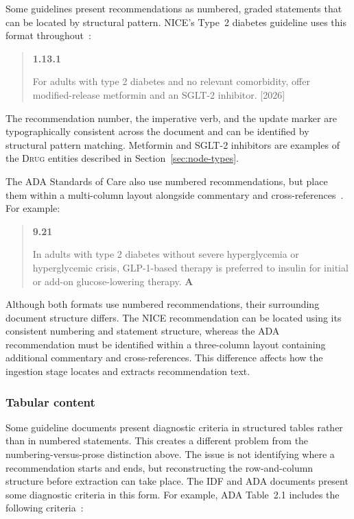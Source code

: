 Some guidelines present recommendations as numbered, graded statements
that can be located by structural pattern. NICE's Type~2 diabetes
guideline uses this format throughout~\cite{NICE_T2_2026}:

\begin{quote}
\noindent
\textbf{1.13.1}\quad
\begin{minipage}[t]{0.82\linewidth}
For adults with type 2 diabetes and no relevant comorbidity, offer
modified-release metformin and an SGLT-2 inhibitor.
\hfill\textnormal{[2026]}
\end{minipage}
\end{quote}

The recommendation number, the imperative verb, and the update marker are
typographically consistent across the document and can be identified by
structural pattern matching. Metformin and SGLT-2 inhibitors are examples
of the \textsc{Drug} entities described in
Section~\ref{sec:node-types}.

The ADA Standards of Care also use numbered
recommendations, but place them within a multi-column layout alongside
commentary and cross-references~\cite{ADA2026}. For example:

\begin{quote}
\noindent
\textbf{9.21}\quad
\begin{minipage}[t]{0.82\linewidth}
In adults with type 2 diabetes without severe hyperglycemia or
hyperglycemic crisis, GLP-1-based therapy is preferred to insulin for
initial or add-on glucose-lowering therapy.
\hfill\textbf{A}
\end{minipage}
\end{quote}

Although both formats use numbered recommendations, their surrounding
document structure differs. The NICE recommendation can be located using
its consistent numbering and statement structure, whereas the ADA
recommendation must be identified within a three-column layout containing
additional commentary and cross-references. This difference affects how
the ingestion stage locates and extracts recommendation text.

\subsubsection{Tabular content}

Some guideline documents present diagnostic criteria in structured tables
rather than in numbered statements. This creates a different problem from
the numbering-versus-prose distinction above. The issue is not identifying
where a recommendation starts and ends, but reconstructing the row-and-column
structure before extraction can take place. The IDF and ADA documents present
some diagnostic criteria in this form. For example, ADA Table~2.1 includes
the following criteria~\cite{ADA2026}:

